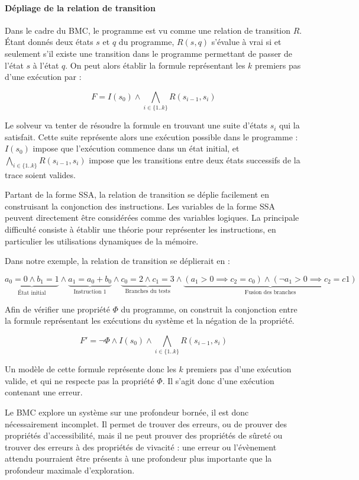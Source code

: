 \paragraph{Dépliage de la relation de transition}
Dans le cadre du \ac{BMC}, le programme est vu comme une relation de transition
\(R\). Étant donnés deux états \(s\) et \(q\) du programme, \(R(s, q)\) s'évalue
à vrai si et seulement s’il existe une transition dans le programme permettant
de passer de l'état \(s\) à l'état \(q\). On peut alors établir la formule
représentant les \(k\) premiers pas d'une exécution par :

\[
F = I(s_0) \land \bigwedge_{i\in \{1..k\}} R(s_{i-1}, s_i)
\]

Le solveur va tenter de résoudre la formule en trouvant une suite d'états
\(s_i\) qui la satisfait. Cette suite représente alors une exécution possible
dans le programme : \(I(s_0)\) impose que l'exécution commence dans un état
initial, et \(\bigwedge_{i\in \{1..k\}} R(s_{i-1}, s_i)\) impose que les
transitions entre deux états successifs de la trace soient valides.

Partant de la forme \ac{SSA}, la relation de transition se déplie facilement
en construisant la conjonction des instructions. Les variables de la forme \ac{SSA}
peuvent directement être considérées comme des variables logiques. La principale
difficulté consiste à établir une théorie pour représenter les
instructions, en particulier les utilisations dynamiques de la mémoire.

Dans notre exemple, la relation de transition se déplierait en :

\[
  \underbrace{a_0 = 0 \land b_1 = 1}_\text{État initial} \land
  \underbrace{a_1 = a_0 + b_0}_\text{Instruction 1} \land
  \underbrace{c_0 = 2 \land c_1 = 3}_\text{Branches du tests} \land
  \underbrace{(a_1 > 0 \implies c_2 = c_0)
    \land (\lnot a_1 > 0 \implies c_2 = c1)
  }_\text{Fusion des branches}
\]


Afin de vérifier une propriété \(\Phi\) du programme, on construit la
conjonction entre la formule représentant les exécutions du système et la
négation de la propriété.

\[
F' = \lnot \Phi \land I(s_0) \land \bigwedge_{i\in \{1..k\}} R(s_{i-1}, s_i)
\]

Un modèle de cette formule représente donc les \(k\) premiers pas d'une
exécution valide, et qui ne respecte pas la propriété \(\Phi\). Il s'agit donc
d'une exécution contenant une erreur.

Le \ac{BMC} explore un système sur une profondeur bornée, il est donc nécessairement
incomplet. Il permet de trouver des erreurs, ou de prouver des propriétés
d'accessibilité, mais il ne peut prouver des propriétés de sûreté ou trouver des
erreurs à des propriétés de vivacité : une erreur ou l'évènement attendu
pourraient être présents à une profondeur plus importante que la profondeur
maximale d'exploration.

